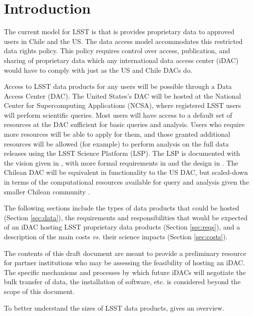 \section{Introduction}\label{sec:intro}


The current model for LSST is that is provides proprietary data to approved users in Chile and the US. The data access model accommodates this restricted data rights policy. This policy requires control over access, publication, and sharing of proprietary data which any international data access center (iDAC) would have to comply with just as the US and Chile DACs do.


Access to LSST data products for any users will be possible through a Data Access Center (DAC). The United States's DAC will be hosted at the National Center for Supercomputing Applications (NCSA),
where registered LSST users will perform scientific queries. Most users will have access to a default set of resources at the DAC sufficient for basic queries and analysis. Users who require more resources will be able to apply for them, and those granted additional resources will be allowed (for example) to perform analysis on the full data releases using the LSST Science Platform (LSP). The LSP is documented with the vision given in , with more formal requirements in  and the design in . The Chilean DAC will be equivalent in functionality to the US DAC, but scaled-down in terms of the computational resources available for query and analysis given the smaller Chilean community .

The following sections include the types of data products that could be hosted (Section \ref{sec:data}), the requirements and responsibilities that would be expected of an iDAC hosting LSST proprietary data products (Section \ref{sec:reqs}), and a description of the main costs {\it vs.} their science impacts (Section \ref{sec:costs}).

The contents of this draft document are meant to provide a preliminary resource for partner institutions who may be assessing the feasibility of hosting an iDAC. The specific mechanisms and processes by which future iDACs will negotiate the bulk transfer of data, the installation of software, etc. is considered beyond the scope of this document.

To better understand the sizes of LSST data products,  gives an overview.



